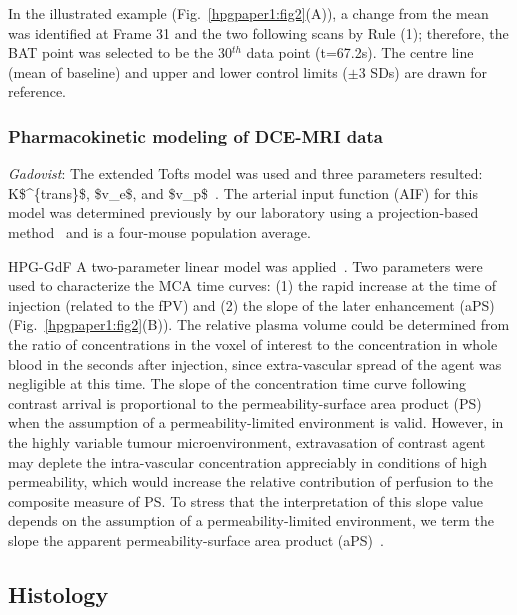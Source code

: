 In the illustrated example (Fig.~\ref{hpgpaper1:fig2}(A)), a change from the mean was identified at Frame 31 and the two following scans by Rule (1); therefore, the \acs{BAT} point was selected to be the 30$^{th}$ data point (t=67.2s).
The centre line (mean of baseline) and upper and lower control limits ($\pm$3 SDs) are drawn for reference.

\subsubsection{Pharmacokinetic modeling of DCE-MRI data}

\textit{Gadovist}: The extended Tofts model was used and three parameters resulted: \acs{K$^{trans}$}, \acs{$v_e$}, and \acs{$v_p$}~\cite{Sourbron:2011ce}.
The arterial input function (AIF) for this model was determined previously by our laboratory using a projection-based method~\cite{Moroz:2013ee} and is a four-mouse population average.

\acs{HPG-GdF} A two-parameter linear model was applied~\cite{Pathak:2005gu}.
Two parameters were used to characterize the \acs{MCA} time curves: (1) the rapid increase at the time of injection (related to the \acs{fPV}) and (2) the slope of the later enhancement (\acs{aPS}) (Fig.~\ref{hpgpaper1:fig2}(B)).
The relative plasma volume could be determined from the ratio of concentrations in the voxel of interest to the concentration in whole blood in the seconds after injection, since extra-vascular spread of the agent was negligible at this time.
The slope of the concentration time curve following contrast arrival is proportional to the permeability-surface area product (\acs{PS}) when the assumption of a permeability-limited environment is valid.
However, in the highly variable tumour microenvironment, extravasation of contrast agent may deplete the intra-vascular concentration appreciably in conditions of high permeability, which would increase the relative contribution of perfusion to the composite measure of \acs{PS}.
To stress that the interpretation of this slope value depends on the assumption of a permeability-limited environment, we term the slope the apparent permeability-surface area product (\acs{aPS})~\cite{DaldrupLink:2004gy,Dafni:2002kb}.

\subsection{Histology}

